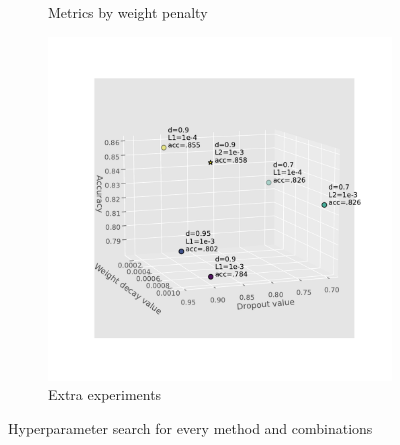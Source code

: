 {{\begin{figure}[t]
\begin{subfigure}{.3\linewidth}
        \caption{Metrics by weight penalty}
        \label{fig:weightrates}
    \end{subfigure} 
    \begin{subfigure}{.39\linewidth}
        \centering
        \includegraphics[width=0.85\linewidth]{figures/dropout_wd_plot.pdf}
        \caption{Extra experiments}
        \label{fig:extra}
    \end{subfigure} 
    \caption{Hyperparameter search for every method and combinations}
    \label{fig:hp_search}
\end{figure}
}
}


\newcommand{\questionTableOne} {
\youranswer{
\begin{table}[t]
    \centering
    \begin{tabular}{c|cc}
    \toprule
        \# hidden units & val. acc. & generalization gap \\
    \midrule
         32            &     0.782  &      0.045         \\
         64            &     0.810  &      0.053         \\
         128           &     0.807  &      0.141         \\
    \bottomrule
    \end{tabular}
    \caption{Validation accuracy (\%) and generalization gap (in terms of cross-entropy error) for varying network widths on the EMNIST dataset.}
    \label{tab:width_exp}
\end{table}
}
}

